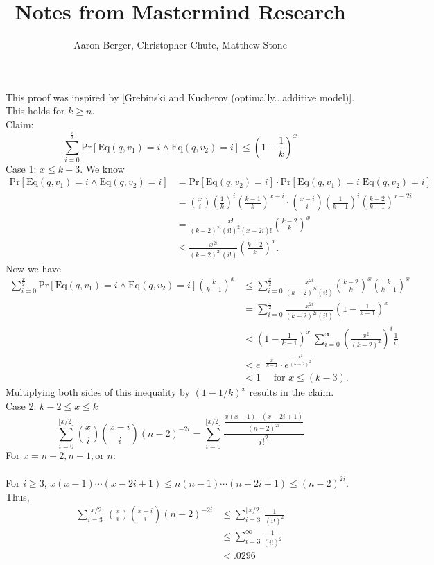 \documentclass[12pt, a4paper]{article}
\author{Aaron Berger, Christopher Chute, Matthew Stone}
\title{Notes from Mastermind Research}
\begin{document}
This proof was inspired by [Grebinski and Kucherov (optimally...additive model)]. This holds for $k\geq n$. \\
Claim:
\begin{equation*}
	\sum_{i=0}^{\frac{x}{2}}\text{Pr}[\text{Eq}(q,v_1) = i \wedge \text{Eq}(q,v_2) = i] \leq \left(1-\frac{1}{k}\right)^x
\end{equation*}
Case 1: $x \leq k-3$. We know 
\begin{align*}
\text{Pr}[\text{Eq}(q,v_1) = i \wedge \text{Eq}(q,v_2) = i] &= 
\text{Pr}[\text{Eq}(q,v_2) = i] \cdot
\text{Pr}[\text{Eq}(q,v_1) = i | \text{Eq}(q,v_2) = i]   \\
& = \binom{x}{i}\left(\frac{1}{k}\right)^i \left(\frac{k-1}{k}\right)^{x-i} \cdot \binom{x-i}{i}\left(\frac{1}{k-1}\right)^{i}\left(\frac{k-2}{k-1}\right)^{x-2i} \\
&=\frac{x!}{(k-2)^{2i}(i!)^2(x-2i)!}\left(\frac{k-2}{k}\right)^x \\
&\leq \frac{x^{2i}}{(k-2)^{2i}(i!)}\left(\frac{k-2}{k}\right)^x.
\end{align*}
Now we have 
\begin{align*}
\sum_{i=0}^{\frac{x}{2}}\text{Pr}[\text{Eq}(q,v_1) = i \wedge \text{Eq}(q,v_2) = i] \left(\frac{k}{k-1}\right)^x 
&\leq \sum_{i=0}^{\frac{x}{2}} \frac{x^{2i}}{(k-2)^{2i}(i!)}\left(\frac{k-2}{k}\right)^x \left(\frac{k}{k-1}\right)^x \\
&=\sum_{i=0}^{\frac{x}{2}} \frac{x^{2i}}{(k-2)^{2i}(i!)}\left(1-\frac{1}{k-1}\right)^x \\
&<\left(1-\frac{1}{k-1}\right)^x ~ \sum_{i=0}^{\infty} \left(\frac{x^2}{(k-2)^2}\right)^i\frac{1}{i!} \\
&<e^{-\frac{x}{k-1}}\cdot e^\frac{x^2}{(k-2)^2} \\
&<1\quad \text{ for } x \leq (k-3).
\end{align*}
Multiplying both sides of this inequality by $(1-1/k)^x$ results in the claim. 
\clearpage
Case 2: $k-2 \leq x \leq k$
\begin{equation*}
\sum_{i=0}^{\lfloor x/2 \rfloor} \binom{x}{i}\binom{x-i}{i}(n-2)^{-2i}=\sum_{i=0}^{\lfloor x/2 \rfloor} \frac{\frac{x(x-1)\cdots(x-2i+1)}{(n-2)^{2i}}}{i!^2}
\end{equation*}
For $x=n-2, n-1, \text{or } n$:\\
\\
For $i\ge3$, $x(x-1)\cdots(x-2i+1)\le n(n-1)\cdots(n-2i+1)\le(n-2)^{2i}$. Thus, 
\begin{align*}
\sum_{i=3}^{\lfloor x/2 \rfloor} \binom{x}{i}\binom{x-i}{i}(n-2)^{-2i} & \le \sum_{i=3}^{\lfloor x/2 \rfloor} \frac{1}{(i!)^2} \\
& \le \sum_{i=3}^\infty \frac{1}{(i!)^2} \\
& < .0296\\
\end{align*}
\end{document}
